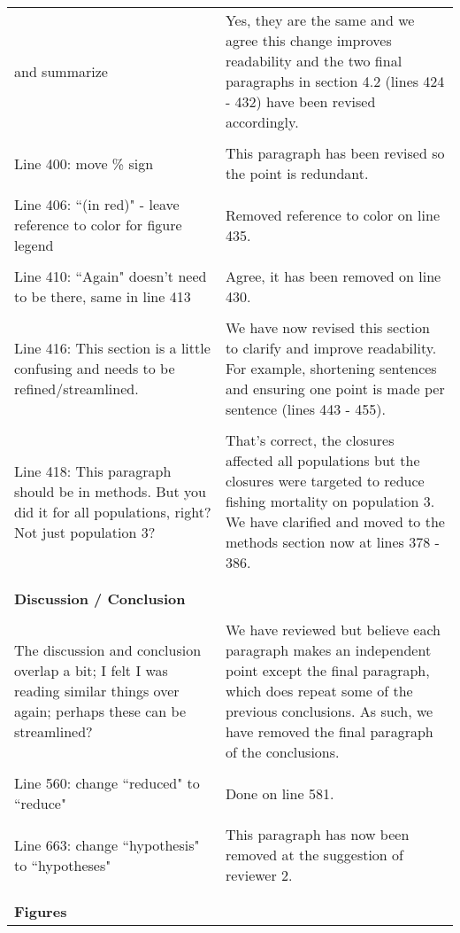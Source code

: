 \documentclass[10pt]{letter}
\begin{document}
\begin{center}
\begin{longtable}{p{8cm} | p{8cm}}
and summarize & Yes, they are the same and we agree this change improves
readability and the two final paragraphs in section 4.2 (lines 424 - 432) have
been revised accordingly. \\ 
\\
Line 400: move \% sign & This paragraph has been revised so the point
	is redundant. \\
\\
Line 406: ``(in red)" - leave reference to color for figure legend & Removed
reference to color on line 435. \\
\\
Line 410: ``Again" doesn't need to be there, same in line 413 & Agree, it has
been removed on line 430. \\
\\
Line 416: This section is a little confusing and needs to be
refined/streamlined. & We have now revised this section to clarify and improve
readability. For example, shortening sentences and ensuring one point is made
per sentence (lines 443 - 455). \\
\\
Line 418: This paragraph should be in methods. But you did it for all
populations, right? Not just population 3? & That's correct, the closures
affected all populations but the closures were targeted to reduce fishing
mortality on population 3. We have clarified and moved to the methods section
now at lines 378 - 386.
\\
\\
\hline
\\
\textbf{Discussion / Conclusion} &  \\
\\
The discussion and conclusion overlap a bit; I felt I was reading similar
things over again; perhaps these can be streamlined? & We have reviewed but
believe each paragraph makes an independent point except the final paragraph,
which does repeat some of the previous conclusions. As such, we have removed
the final paragraph of the conclusions. \\
\\
Line 560: change ``reduced" to ``reduce" & Done on line 581. \\
\\
Line 663: change ``hypothesis" to ``hypotheses" & This paragraph has now been
removed at the suggestion of reviewer 2. \\
\\
\hline
\\
\textbf{Figures} &  \\

\end{longtable}
\end{center}
\end{document}
